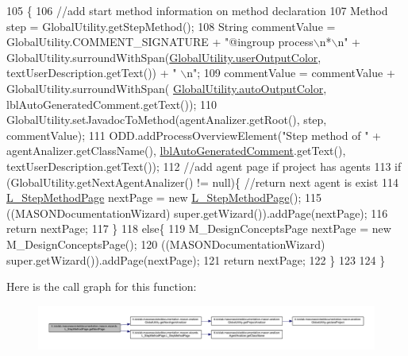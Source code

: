 \begin{DoxyCode}
105                                     \{ 
106         \textcolor{comment}{//add start method information on method declaration}
107         Method step = GlobalUtility.getStepMethod();
108         String commentValue = GlobalUtility.COMMENT\_SIGNATURE + \textcolor{stringliteral}{"@ingroup process\(\backslash\)n*\(\backslash\)n"} + 
      GlobalUtility.surroundWithSpan(\hyperlink{classit_1_1isislab_1_1masonassisteddocumentation_1_1mason_1_1analizer_1_1_global_utility_a0fcb324ae33eb93bd5b9177e342ecc82}{GlobalUtility.userOutputColor}, textUserDescription.getText()) + \textcolor{stringliteral}{"
      \(\backslash\)n"};
109         commentValue = commentValue + GlobalUtility.surroundWithSpan(
      \hyperlink{classit_1_1isislab_1_1masonassisteddocumentation_1_1mason_1_1analizer_1_1_global_utility_a2e086c8a2d8edf16b2eaf90408832adc}{GlobalUtility.autoOutputColor}, lblAutoGeneratedComment.getText());
110         GlobalUtility.setJavadocToMethod(agentAnalizer.getRoot(), step, commentValue);
111         ODD.addProcessOverviewElement(\textcolor{stringliteral}{"Step method of "} + agentAnalizer.getClassName(), 
      \hyperlink{classit_1_1isislab_1_1masonassisteddocumentation_1_1mason_1_1wizards_1_1_l___step_method_page_ae387c5a1c2bc2000a32d76fa15d5002f}{lblAutoGeneratedComment}.getText(), textUserDescription.getText());
112         \textcolor{comment}{//add agent page if project has agents}
113         \textcolor{keywordflow}{if} (GlobalUtility.getNextAgentAnalizer() != null)\{  \textcolor{comment}{//return next agent is exist}
114             \hyperlink{classit_1_1isislab_1_1masonassisteddocumentation_1_1mason_1_1wizards_1_1_l___step_method_page_a177f2d92f21a604cf845592cb5158919}{L\_StepMethodPage} nextPage = \textcolor{keyword}{new} \hyperlink{classit_1_1isislab_1_1masonassisteddocumentation_1_1mason_1_1wizards_1_1_l___step_method_page_a177f2d92f21a604cf845592cb5158919}{L\_StepMethodPage}();
115             ((MASONDocumentationWizard) super.getWizard()).addPage(nextPage);
116             \textcolor{keywordflow}{return} nextPage;
117         \}
118         \textcolor{keywordflow}{else}\{
119             M\_DesignConceptsPage nextPage = \textcolor{keyword}{new} M\_DesignConceptsPage();
120             ((MASONDocumentationWizard) super.getWizard()).addPage(nextPage);
121             \textcolor{keywordflow}{return} nextPage;
122         \}
123         
124     \}
\end{DoxyCode}


Here is the call graph for this function\-:
\nopagebreak
\begin{figure}[H]
\begin{center}
\leavevmode
\includegraphics[width=350pt]{classit_1_1isislab_1_1masonassisteddocumentation_1_1mason_1_1wizards_1_1_l___step_method_page_ac7b8048dd2841c779f601c26669af578_cgraph}
\end{center}
\end{figure}


